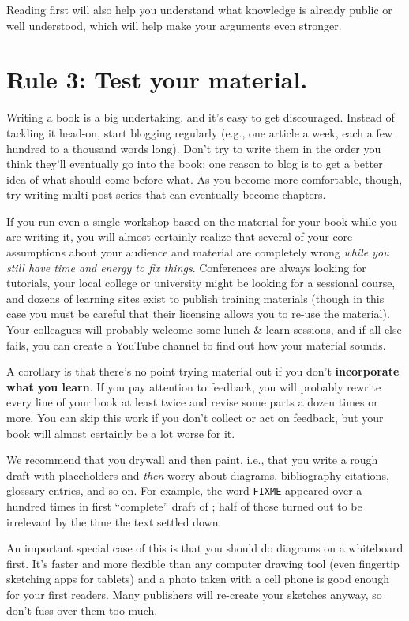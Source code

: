 \documentclass[10pt,letterpaper]{article}
\begin{document}
Reading first will also help you understand what knowledge is already
public or well understood, which will help make your arguments even
stronger.

\section*{Rule 3: Test your material.}

Writing a book is a big undertaking, and it's easy to get discouraged.
Instead of tackling it head-on, start blogging regularly (e.g., one
article a week, each a few hundred to a thousand words long).  Don't
try to write them in the order you think they'll eventually go into
the book: one reason to blog is to get a better idea of what should
come before what.  As you become more comfortable, though, try writing
multi-post series that can eventually become chapters.

If you run even a single workshop based on the material for your book
while you are writing it, you will almost certainly realize that
several of your core assumptions about your audience and material are
completely wrong \emph{while you still have time and energy to fix
things}.  Conferences are always looking for tutorials, your local
college or university might be looking for a sessional course, and
dozens of learning sites exist to publish training materials (though
in this case you must be careful that their licensing allows you to
re-use the material).  Your colleagues will probably welcome some
lunch \& learn sessions, and if all else fails, you can create a
YouTube channel to find out how your material sounds.

A corollary is that there's no point trying material out if you don't
\textbf{incorporate what you learn}.  If you pay attention to
feedback, you will probably rewrite every line of your book at least
twice and revise some parts a dozen times or more.  You can skip this
work if you don't collect or act on feedback, but your book will
almost certainly be a lot worse for it.

We recommend that you drywall and then paint, i.e., that you write a
rough draft with placeholders and \emph{then} worry about diagrams,
bibliography citations, glossary entries, and so on.  For example, the
word \texttt{FIXME} appeared over a hundred times in first
``complete'' draft of \cite{Wi2019}; half of those turned out to be
irrelevant by the time the text settled down.

An important special case of this is that you should do diagrams on a
whiteboard first.  It's faster and more flexible than any computer
drawing tool (even fingertip sketching apps for tablets) and a photo
taken with a cell phone is good enough for your first readers.  Many
publishers will re-create your sketches anyway, so don't fuss over
them too much.
\end{document}
